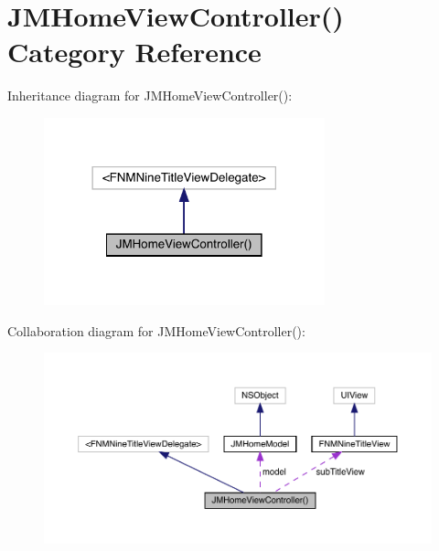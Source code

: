 \hypertarget{category_j_m_home_view_controller_07_08}{}\section{J\+M\+Home\+View\+Controller() Category Reference}
\label{category_j_m_home_view_controller_07_08}


Inheritance diagram for J\+M\+Home\+View\+Controller()\+:\nopagebreak
\begin{figure}[H]
\begin{center}
\leavevmode
\includegraphics[width=230pt]{category_j_m_home_view_controller_07_08__inherit__graph}
\end{center}
\end{figure}


Collaboration diagram for J\+M\+Home\+View\+Controller()\+:\nopagebreak
\begin{figure}[H]
\begin{center}
\leavevmode
\includegraphics[width=350pt]{category_j_m_home_view_controller_07_08__coll__graph}
\end{center}
\end{figure}
